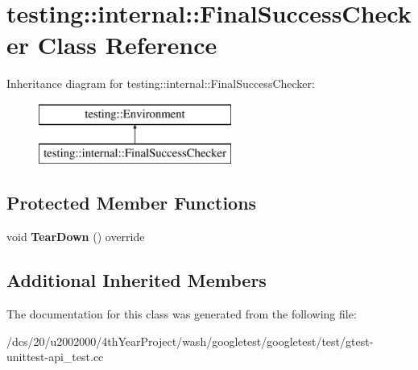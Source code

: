 \hypertarget{classtesting_1_1internal_1_1FinalSuccessChecker}{}\section{testing\+:\+:internal\+:\+:Final\+Success\+Checker Class Reference}
\label{classtesting_1_1internal_1_1FinalSuccessChecker}
Inheritance diagram for testing\+:\+:internal\+:\+:Final\+Success\+Checker\+:\begin{figure}[H]
\begin{center}
\leavevmode
\includegraphics[height=2.000000cm]{classtesting_1_1internal_1_1FinalSuccessChecker}
\end{center}
\end{figure}
\subsection*{Protected Member Functions}
\begin{DoxyCompactItemize}
\item 
\mbox{\label{classtesting_1_1internal_1_1FinalSuccessChecker_a15ba1169b52bbf73a3ccea0c9f55cefd}} 
void {\bfseries Tear\+Down} () override
\end{DoxyCompactItemize}
\subsection*{Additional Inherited Members}


The documentation for this class was generated from the following file\+:\begin{DoxyCompactItemize}
\item 
/dcs/20/u2002000/4th\+Year\+Project/wash/googletest/googletest/test/gtest-\/unittest-\/api\+\_\+test.\+cc\end{DoxyCompactItemize}
